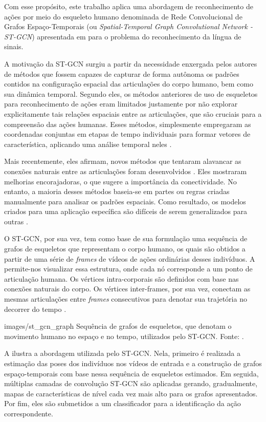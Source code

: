 Com esse propósito, este trabalho aplica uma abordagem de reconhecimento de ações por meio do esqueleto humano denominada de Rede Convolucional de Grafos Espaço-Temporais (ou \textit{Spatial-Temporal Graph Convolutional Network - ST-GCN}) apresentada em \cite{st-gcn-2018} para o problema do reconhecimento da língua de sinais. 

A motivação da ST-GCN surgiu a partir da necessidade enxergada pelos autores de métodos que fossem capazes de capturar de forma autônoma os padrões contidos na configuração espacial das articulações do corpo humano, bem como sua dinâmica temporal. Segundo eles, os métodos anteriores de uso de esqueletos para reconhecimento de ações eram limitados justamente por não explorar explicitamente tais relações espaciais entre as articulações, que são cruciais para a compreensão das ações humanas. Esses métodos, simplesmente empregaram as coordenadas conjuntas em etapas de tempo individuais para formar vetores de característica, aplicando uma análise temporal neles \cite{st-gcn-2018, wang-2012, fernando-2015}.

Mais recentemente, eles afirmam, novos métodos que tentaram alavancar as conexões naturais entre as articulações foram desenvolvidos \cite{shahroudy-2016, yong-du-2015}. Eles mostraram melhorias encorajadoras, o que sugere a importância da conectividade. No entanto, a maioria desses métodos baseia-se em partes ou regras criadas manualmente para analisar os padrões espaciais. Como resultado, os modelos criados para uma aplicação específica são difíceis de serem generalizados para outras \cite{st-gcn-2018}.

O ST-GCN, por sua vez, tem como base de sua formulação uma sequência de grafos de esqueletos que representam o corpo humano, os quais são obtidos a partir de uma série de \textit{frames} de vídeos de ações ordinárias desses indivíduos. A  permite-nos visualizar essa estrutura, onde cada nó corresponde a um ponto de articulação humana. Os vértices intra-corporais são definidos com base nas conexões naturais do corpo. Os vértices inter-frames, por sua vez, conectam as mesmas articulações entre \textit{frames} consecutivos para denotar sua trajetória no decorrer do tempo \cite{st-gcn-2018}.

    {images/st_gcn_graph}
    {Sequência de grafos de esqueletos, que denotam o movimento humano no espaço e no tempo, utilizados pelo ST-GCN. Fonte: \cite[p. 1]{st-gcn-2018}.}

A  ilustra a abordagem utilizada pelo ST-GCN. Nela, primeiro é realizada a estimação das poses dos indivíduos nos vídeos de entrada e a construção de grafos espaço-temporais com base nessa sequência de esqueletos estimados. Em seguida, múltiplas camadas de convolução ST-GCN são aplicadas gerando, gradualmente, mapas de características de nível cada vez mais alto para os grafos apresentados. Por fim, eles são submetidos a um classificador para a identificação da ação correspondente.

